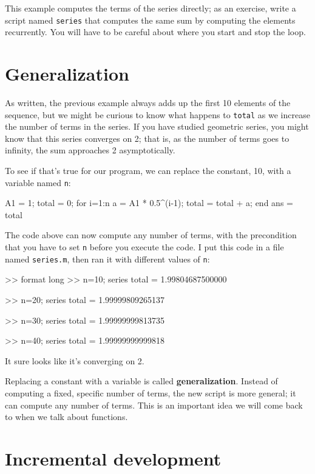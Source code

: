 \documentclass[
]{book}
\numberwithin{Answer}{chapter}
\numberwithin{Exercise}{chapter}
\begin{document}
\begin{ex}
This example computes the terms of the series directly; as
an exercise, write a script named {\tt series} that computes
the same sum by computing the elements recurrently.  You will
have to be careful about where you start and stop the loop.
\end{ex}


\section{Generalization}


As written, the previous example always adds up the first 10
elements of the sequence, but we might be curious to know what
happens to {\tt total} as we increase the
number of terms in the series.  If you have studied geometric
series, you might know that this series converges on 2; that is,
as the number of terms goes to infinity, the sum approaches
2 asymptotically.

To see if that's true for our program, we can replace the
constant, 10, with a variable named {\tt n}:

\begin{code}
A1 = 1;
total = 0;
for i=1:n
    a = A1 * 0.5^(i-1);
    total = total + a;
end
ans = total
\end{code}

The code above can now compute any number of terms, with the
precondition that you have to set {\tt n} before you execute
the code.  
I put this code in a file named {\tt series.m}, then
ran it with different values of {\tt n}:

\begin{code}
>> format long
>> n=10; series
total = 1.99804687500000

>> n=20; series
total = 1.99999809265137

>> n=30; series
total = 1.99999999813735

>> n=40; series
total = 1.99999999999818
\end{code}

It sure looks like it's converging on 2.

Replacing a constant with a variable is called {\bf generalization}.
Instead of computing a fixed, specific number of terms, the new script
is more general; it can compute any number of terms.
This is an important idea we will come back to when we talk about functions.

\section{Incremental development}
\end{document}
